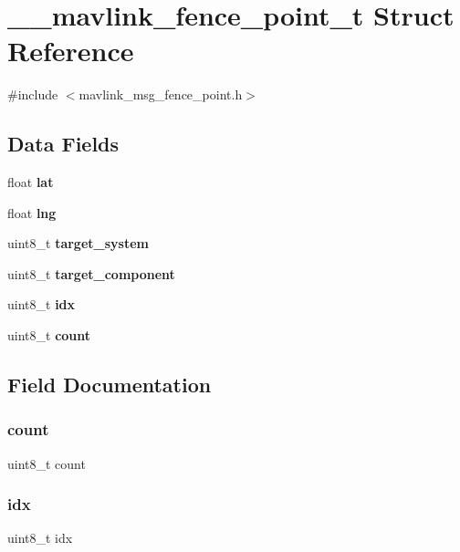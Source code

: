 \section{\+\_\+\+\_\+mavlink\+\_\+fence\+\_\+point\+\_\+t Struct Reference}
\label{struct____mavlink__fence__point__t}


{\ttfamily \#include $<$mavlink\+\_\+msg\+\_\+fence\+\_\+point.\+h$>$}

\subsection*{Data Fields}
\begin{DoxyCompactItemize}
\item 
float \textbf{ lat}
\item 
float \textbf{ lng}
\item 
uint8\+\_\+t \textbf{ target\+\_\+system}
\item 
uint8\+\_\+t \textbf{ target\+\_\+component}
\item 
uint8\+\_\+t \textbf{ idx}
\item 
uint8\+\_\+t \textbf{ count}
\end{DoxyCompactItemize}


\subsection{Field Documentation}
\mbox{\label{struct____mavlink__fence__point__t_a20302e2c99a60d3f612dba57e3f6333b}} 
\subsubsection{count}
{\footnotesize\ttfamily uint8\+\_\+t count}

\mbox{\label{struct____mavlink__fence__point__t_a266732d9c228f9bac150e7554734d112}} 
\subsubsection{idx}
{\footnotesize\ttfamily uint8\+\_\+t idx}

